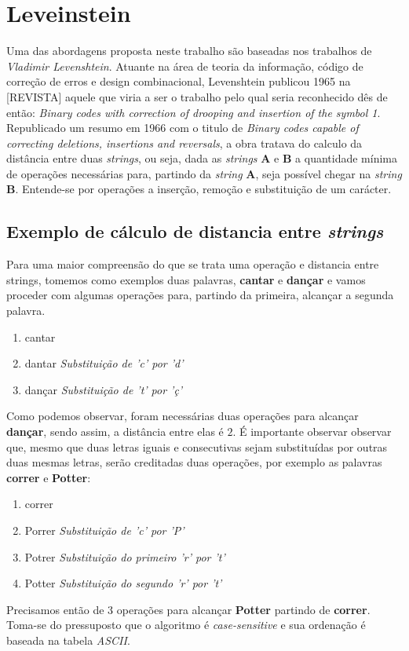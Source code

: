 \section{Leveinstein} %
\label{sec:leveinstein}

Uma das abordagens proposta neste trabalho são baseadas nos trabalhos de \textit{Vladimir Levenshtein}. Atuante na área de teoria da informação, código de correção de erros e design combinacional, Levenshtein publicou 1965 na [REVISTA] aquele que viria a ser o trabalho pelo qual seria reconhecido dês de então: \textit{Binary codes with correction of drooping and insertion of the symbol 1}\cite{levenshtein1965}. Republicado um resumo em 1966 com o titulo de \textit{Binary codes capable of correcting deletions, insertions and reversals}\cite{levenshtein1966}, a obra tratava do calculo da distância entre duas \textit{strings}, ou seja, dada as \textit{strings} \textbf{A} e \textbf{B} a quantidade mínima de operações necessárias para, partindo da \textit{string} \textbf{A}, seja possível chegar na \textit{string} \textbf{B}. Entende-se por operações a inserção, remoção e substituição de um carácter.

\subsection{Exemplo de cálculo de distancia entre \textit{strings}} %
\label{sub:exemplo_de_c_lculo_de_distancia_entre_it}

Para uma maior compreensão do que se trata uma operação e distancia entre strings, tomemos como exemplos duas palavras, \textbf{cantar} e \textbf{dançar} e vamos proceder com algumas operações para, partindo da primeira, alcançar a segunda palavra.


\begin{enumerate}[start=0]
	\item cantar
	\item dantar \textit{Substituição de 'c' por 'd'}
	\item dançar \textit{Substituição de 't' por 'ç'}
\end{enumerate}

Como podemos observar, foram necessárias duas operações para alcançar \textbf{dançar}, sendo assim, a distância entre elas é $2$.
É importante observar observar que, mesmo que duas letras iguais e consecutivas sejam substituídas por outras duas mesmas letras, serão creditadas duas operações, por exemplo as palavras \textbf{correr} e \textbf{Potter}:

\begin{enumerate}[start=0]
	\item correr
	\item Porrer \textit{Substituição de 'c' por 'P'}
	\item Potrer \textit{Substituição do primeiro 'r' por 't'}
	\item Potter \textit{Substituição do segundo 'r' por 't'}
\end{enumerate}

Precisamos então de 3 operações para alcançar \textbf{Potter} partindo de \textbf{correr}. Toma-se do pressuposto que o algoritmo é \textit{case-sensitive} e sua ordenação é baseada na tabela \textit{ASCII}.

